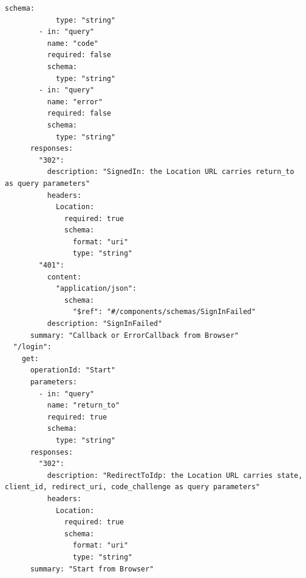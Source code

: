 \begin{lstlisting}[language={},basicstyle=\ttfamily\scriptsize,breaklines=true]
          schema:
            type: "string"
        - in: "query"
          name: "code"
          required: false
          schema:
            type: "string"
        - in: "query"
          name: "error"
          required: false
          schema:
            type: "string"
      responses:
        "302":
          description: "SignedIn: the Location URL carries return_to as query parameters"
          headers:
            Location:
              required: true
              schema:
                format: "uri"
                type: "string"
        "401":
          content:
            "application/json":
              schema:
                "$ref": "#/components/schemas/SignInFailed"
          description: "SignInFailed"
      summary: "Callback or ErrorCallback from Browser"
  "/login":
    get:
      operationId: "Start"
      parameters:
        - in: "query"
          name: "return_to"
          required: true
          schema:
            type: "string"
      responses:
        "302":
          description: "RedirectToIdp: the Location URL carries state, client_id, redirect_uri, code_challenge as query parameters"
          headers:
            Location:
              required: true
              schema:
                format: "uri"
                type: "string"
      summary: "Start from Browser"
\end{lstlisting}
